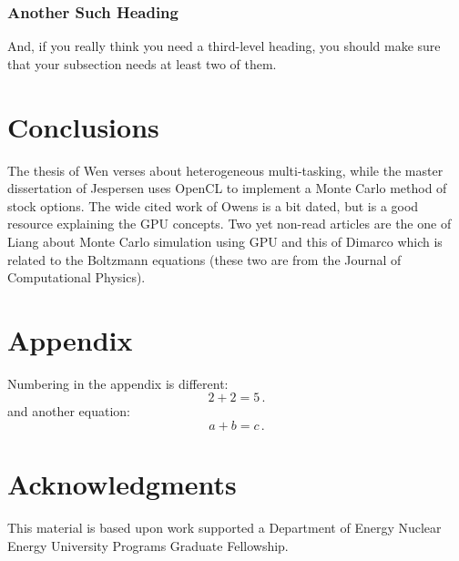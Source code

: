\documentclass[twoside,a4paper,12pt,english,draft]{anstrans}
\begin{document}
\subsubsection{Another Such Heading}
And, if you really think you need a third-level heading, you should make sure
that your subsection needs at least two of them.

\section{Conclusions}

The thesis of Wen \cite{Wen2017} verses about heterogeneous multi-tasking, while
the master dissertation of Jespersen \cite{Jespersen2015} uses OpenCL to implement
a Monte Carlo method of stock options. The wide cited work of Owens \cite{Owens2007}
is a bit dated, but is a good resource explaining the GPU concepts. Two yet non-read articles
are the one of Liang \cite{Liang2017} about Monte Carlo simulation using GPU and this of Dimarco
\cite{Dimarco2017} which is related to the Boltzmann equations (these two are from the Journal
of Computational Physics).

\appendix
\section{Appendix}

Numbering in the appendix is different:
\begin{equation} \label{eq:appendix}
  2 + 2 = 5\,.
\end{equation}
and another equation:
\begin{equation} \label{eq:appendix2}
  a + b = c\,.
\end{equation}

\section{Acknowledgments}
This material is based upon work supported a Department of Energy Nuclear
Energy University Programs Graduate Fellowship.


\end{document}
